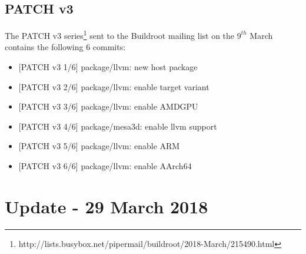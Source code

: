 \documentclass[12pt,a4paper,oneside]{article}
\begin{document}
\subsection*{PATCH v3}
The PATCH v3 series\footnote{http://lists.busybox.net/pipermail/buildroot/2018-March/215490.html}
sent to the Buildroot mailing list on the $9^{th}$ March contains the following
6 commits:
\begin{itemize}
  \item {[PATCH v3 1/6]} package/llvm: new host package
  \item {[PATCH v3 2/6]} package/llvm: enable target variant
  \item {[PATCH v3 3/6]} package/llvm: enable AMDGPU
  \item {[PATCH v3 4/6]} package/mesa3d: enable llvm support
  \item {[PATCH v3 5/6]} package/llvm: enable ARM
  \item {[PATCH v3 6/6]} package/llvm: enable AArch64
\end{itemize}

\newpage
\section*{Update - 29 March 2018}
\end{document}
